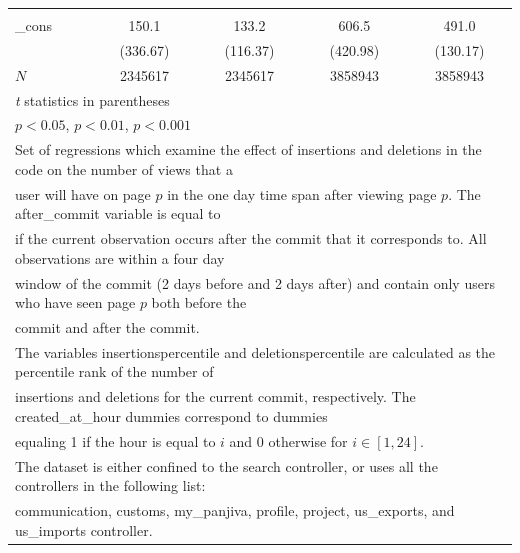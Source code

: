 \documentclass[12pt]{article}
\begin{document}
\begin{table}
{\begin{tabular}{l*{4}{c}}
        &                     &            &                     &      \\
        [1em]
        \_cons      &       150.1\sym{***}&       133.2\sym{***}&       606.5\sym{***}&       491.0\sym{***}\\
        &    (336.67)         &    (116.37)         &    (420.98)         &    (130.17)         \\
        \hline
        \(N\)       &     2345617         &     2345617         &     3858943         &     3858943         \\
        \hline\hline
        \multicolumn{5}{l}{\footnotesize \textit{t} statistics in parentheses}\\
        \multicolumn{5}{l}{\footnotesize \sym{*} \(p<0.05\), \sym{**} \(p<0.01\), \sym{***} \(p<0.001\)}\\
        \multicolumn{5}{l}{Set of regressions which examine the effect of insertions and deletions in the code on the number of views that a}\\
        \multicolumn{5}{l}{user will have on page $p$ in the one day time span after viewing page $p$. The after\_commit variable is equal to}\\
        \multicolumn{5}{l}{if the current observation occurs after the commit that it corresponds to. All observations are within a four day}\\
        \multicolumn{5}{l}{window of the commit (2 days before and 2 days after) and contain only users who have seen page $p$ both before the}\\
        \multicolumn{5}{l}{commit and after the commit.}\\
        \multicolumn{5}{l}{The variables insertionspercentile and deletionspercentile are calculated as the percentile rank of the number of}\\
        \multicolumn{5}{l}{insertions and deletions for the current commit, respectively. The created\_at\_hour dummies correspond to dummies}\\
        \multicolumn{5}{l}{equaling 1 if the hour is equal to $i$ and 0 otherwise for $i \in [1,24]$.}\\ 
        \multicolumn{5}{l}{The dataset is either confined to the search controller, or uses all the controllers in the following list:}\\
        \multicolumn{5}{l}{communication, customs, my\_panjiva, profile, project, us\_exports, and us\_imports controller.}
        \end{tabular}
}
\label{table:commit-percentiles-micro}
\end{table}
\end{document}
